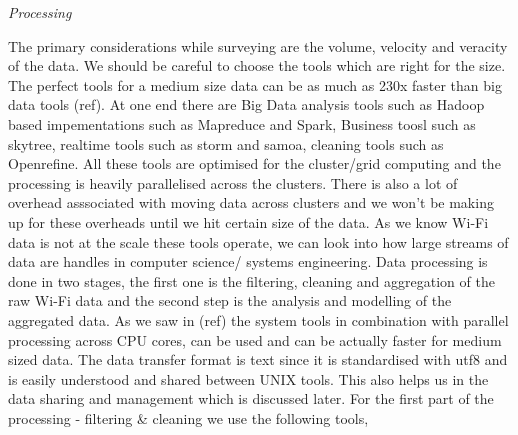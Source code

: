 
\vspace{1.5em}\noindent\textit{Processing}\vspace{0.5em}

The primary considerations while surveying are the volume, velocity and veracity
of the data.
We should be careful to choose the tools which are right for the size.
The perfect tools for a medium size data can be as much as 230x faster than big data tools (ref).
At one end there are Big Data analysis tools such as Hadoop based impementations such as Mapreduce and Spark, Business toosl such as skytree, realtime tools such as storm and samoa, cleaning tools such as Openrefine.
All these tools are optimised for the cluster/grid computing and the processing is heavily parallelised across the clusters.
There is also a lot of overhead asssociated with moving data across clusters and we won't be making up for these overheads until we hit certain size of the data.
As we know Wi-Fi data is not at the scale these tools operate, we can look into how large streams of data are handles in computer science/ systems engineering.
Data processing is done in two stages, the first one is the filtering, cleaning and aggregation of the raw Wi-Fi data and the second step is the analysis and modelling of the aggregated data.
As we saw in (ref) the system tools in combination with parallel processing across CPU cores, can be used and can be actually faster for medium sized data.
The data transfer format is text since it is standardised with utf8 and is easily understood and shared between UNIX tools.
This also helps us in the data sharing and management which is discussed later.
For the first part of the processing - filtering \& cleaning we use the following tools,

